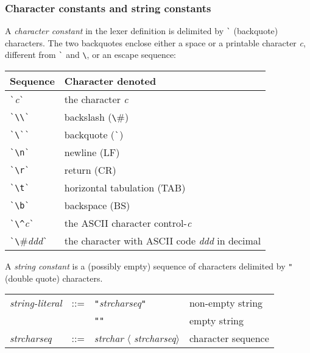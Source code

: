 \documentclass[fleqn,a4paper]{article}
\begin{document}
\subsubsection{Character constants and string constants}
\label{sec-character-string-constants}

A \emph{character constant} in the lexer definition is delimited by
\verb#`# (backquote) characters.  The two backquotes enclose either a
space or a printable character {\it c\/}, different from \verb#`# and
\verb#\#, or an escape sequence:

\begin{quot}
\begin{tabular}{@{}|l|l|}\hline
Sequence & Character denoted \\\hline
\verb#`#{\it c\/}\verb#`# & the character {\it c\/}\\
\verb#`\\`#        &  backslash (\verb#\#)\\
\verb#`\``#               & backquote (\verb#`#)\\
\verb#`\n`#       & newline (LF)\\
\verb#`\r`#       & return (CR)\\
\verb#`\t`#       & horizontal tabulation (TAB)\\
\verb#`\b`#       & backspace (BS)\\
\verb#`\^#{\it c\/}\verb#`#      & the ASCII character control-{\it c\/}\\
\verb#`\#{\it ddd\/}\verb#`#     & the character with ASCII code {\it ddd\/} in
decimal\\\hline 
\end{tabular}
\end{quot}

\noindent 
A \emph{string constant} is a (possibly empty) sequence of characters
delimited by {\tt "} (double quote) characters.

\begin{quot}
\begin{tabular}{lcll}
  {\it string-literal\/} & ::= & {\tt "}{\it strcharseq\/}{\tt "}
        & non-empty string\\
  & &                            {\tt ""} & empty string\\[2ex]

{\it strcharseq\/} & ::= & {\it strchar\/} $\langle${\it
  strcharseq\/}$\rangle$ & character sequence
\end{tabular}
\end{quot}
\end{document}
